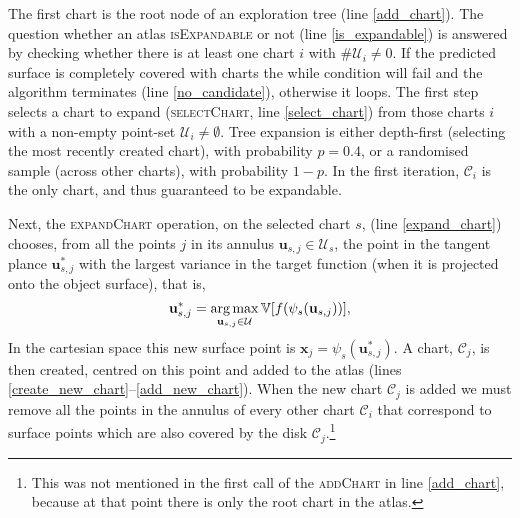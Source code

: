 The first chart is the root node of an exploration tree (line \ref{add_chart}). The question whether an atlas \textsc{isExpandable} or not (line \ref{is_expandable}) is answered by checking whether there is at least one chart $i$ with $\#\mathcal{U}_i \neq 0$. If the predicted surface is completely covered with charts the while condition will fail and the algorithm terminates (line \ref{no_candidate}), otherwise it loops. The first step selects a chart to expand (\textsc{selectChart}, line \ref{select_chart}) from those charts $i$ with a non-empty point-set $\mathcal{U}_i \neq \emptyset$. Tree expansion is either depth-first (selecting the most recently created chart), with probability $p = 0.4$, or a randomised sample (across other charts), with probability $1-p$. In the first iteration, $\mathcal{C}_i$ is the only chart, and thus guaranteed to be expandable. 

Next, the \textsc{expandChart} operation, on the selected chart $s$, (line \ref{expand_chart}) chooses, from all the points $j$ in its annulus $\mathbf{u}_{s,j} \in \mathcal{U}_s$, the point in the tangent plance $\mathbf{u}^*_{s,j}$ with the largest variance in the target function (when it is projected onto the object surface), that is,
\begin{equation}
\mathbf{u}_{s,j}^* =  \operatorname*{arg\,max}_{\mathbf{u}_{s,j} \in \mathcal{U}} \mathbb{V}[f(\psi_s(\mathbf{u}_{s,j}))], 
\end{equation}
In the cartesian space this new surface point is $\mathbf{x}_j = \psi_s(\mathbf{u}_{s,j}^*)$. A chart, $\mathcal{C}_j$, is then created, centred on this point and added to the atlas (lines \ref{create_new_chart}--\ref{add_new_chart}). When the new chart $\mathcal{C}_j$ is added we must remove all the points in the annulus of every other chart $\mathcal{C}_i$ that correspond to surface points which are also covered by the disk $\mathcal{C}_j$.\footnote{This was not mentioned in the first call of the \textsc{addChart} in line \ref{add_chart}, because at that point there is only the root chart in the atlas.}


